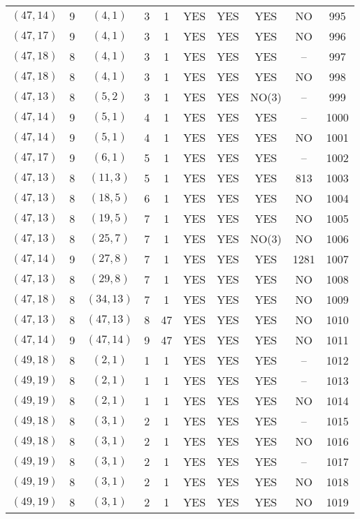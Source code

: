 \begin{longtable}{|c|c|c|c|c|c|c|c|c|c|}
$(47, 14)$ & 9 & $(4, 1)$ & 3 & 1 & YES & YES & YES & NO & 995\\
$(47, 17)$ & 9 & $(4, 1)$ & 3 & 1 & YES & YES & YES & NO & 996\\
$(47, 18)$ & 8 & $(4, 1)$ & 3 & 1 & YES & YES & YES & -- & 997\\
$(47, 18)$ & 8 & $(4, 1)$ & 3 & 1 & YES & YES & YES & NO & 998\\
$(47, 13)$ & 8 & $(5, 2)$ & 3 & 1 & YES & YES & NO(3) & -- & 999\\
$(47, 14)$ & 9 & $(5, 1)$ & 4 & 1 & YES & YES & YES & -- & 1000\\
$(47, 14)$ & 9 & $(5, 1)$ & 4 & 1 & YES & YES & YES & NO & 1001\\
$(47, 17)$ & 9 & $(6, 1)$ & 5 & 1 & YES & YES & YES & -- & 1002\\
$(47, 13)$ & 8 & $(11, 3)$ & 5 & 1 & YES & YES & YES & 813 & 1003\\
$(47, 13)$ & 8 & $(18, 5)$ & 6 & 1 & YES & YES & YES & NO & 1004\\
$(47, 13)$ & 8 & $(19, 5)$ & 7 & 1 & YES & YES & YES & NO & 1005\\
$(47, 13)$ & 8 & $(25, 7)$ & 7 & 1 & YES & YES & NO(3) & NO & 1006\\
$(47, 14)$ & 9 & $(27, 8)$ & 7 & 1 & YES & YES & YES & 1281 & 1007\\
$(47, 13)$ & 8 & $(29, 8)$ & 7 & 1 & YES & YES & YES & NO & 1008\\
$(47, 18)$ & 8 & $(34, 13)$ & 7 & 1 & YES & YES & YES & NO & 1009\\
$(47, 13)$ & 8 & $(47, 13)$ & 8 & 47 & YES & YES & YES & NO & 1010\\
$(47, 14)$ & 9 & $(47, 14)$ & 9 & 47 & YES & YES & YES & NO & 1011\\
$(49, 18)$ & 8 & $(2, 1)$ & 1 & 1 & YES & YES & YES & -- & 1012\\
$(49, 19)$ & 8 & $(2, 1)$ & 1 & 1 & YES & YES & YES & -- & 1013\\
$(49, 19)$ & 8 & $(2, 1)$ & 1 & 1 & YES & YES & YES & NO & 1014\\
$(49, 18)$ & 8 & $(3, 1)$ & 2 & 1 & YES & YES & YES & -- & 1015\\
$(49, 18)$ & 8 & $(3, 1)$ & 2 & 1 & YES & YES & YES & NO & 1016\\
$(49, 19)$ & 8 & $(3, 1)$ & 2 & 1 & YES & YES & YES & -- & 1017\\
$(49, 19)$ & 8 & $(3, 1)$ & 2 & 1 & YES & YES & YES & NO & 1018\\
$(49, 19)$ & 8 & $(3, 1)$ & 2 & 1 & YES & YES & YES & NO & 1019\\

\end{longtable}
